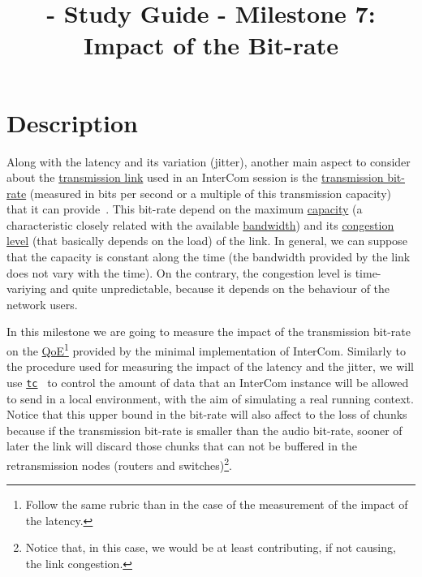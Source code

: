 
\title{\TM - Study Guide - Milestone 7: Impact of the Bit-rate}

\maketitle

\section{Description}

Along with the latency and its variation (jitter), another main aspect
to consider about the
\href{https://en.wikipedia.org/wiki/Telecommunications_link}{transmission
  link} used in an InterCom session is the
\href{https://en.wikipedia.org/wiki/Bit_rate}{transmission bit-rate}
(measured in bits per second or a multiple of this transmission
capacity) that it can provide~\cite{Forouzan,Tanenbaum}. This bit-rate
depend on the maximum
\href{https://en.wikipedia.org/wiki/Bandwidth_(computing)}{capacity}
(a characteristic closely related with the available
\href{https://en.wikipedia.org/wiki/Bandwidth_(signal_processing)}{bandwidth})
and its
\href{https://en.wikipedia.org/wiki/Network_congestion}{congestion
  level} (that basically depends on the load) of the link. In general,
we can suppose that the capacity is constant along the time (the
bandwidth provided by the link does not vary with the time). On the
contrary, the congestion level is time-variying and quite
unpredictable, because it depends on the behaviour of the network
users.

In this milestone we are going to measure the impact of the
transmission bit-rate on the
\href{https://en.wikipedia.org/wiki/Quality_of_experience}{QoE}\footnote{Follow
  the same rubric than in the case of the measurement of the impact of
  the latency.} provided by the minimal implementation of InterCom. Similarly to the procedure used for measuring the impact of
the latency and the jitter, we will use
\href{https://man7.org/linux/man-pages/man8/tc.8.html}{\texttt{tc}}~\cite{bert2012lartc}
to control the amount of data that an InterCom instance will be
allowed to send in a local environment, with the aim of simulating a
real running context. Notice that this upper bound in the bit-rate
will also affect to the loss of chunks because if the transmission
bit-rate is smaller than the audio bit-rate, sooner of later the link
will discard those chunks that can not be buffered in the retransmission
nodes (routers and switches)\footnote{Notice that, in this case, we
would be at least contributing, if not causing, the link congestion.}.


